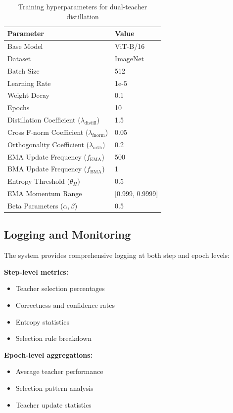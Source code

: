 \documentclass[11pt,a4paper]{article}
\begin{document}
\begin{table}[h]
\centering
\begin{tabular}{ll}
\toprule
\textbf{Parameter} & \textbf{Value} \\
\midrule
Base Model & ViT-B/16 \\
Dataset & ImageNet \\
Batch Size & 512 \\
Learning Rate & 1e-5 \\
Weight Decay & 0.1 \\
Epochs & 10 \\
Distillation Coefficient ($\lambda_{\text{distill}}$) & 1.5 \\
Cross F-norm Coefficient ($\lambda_{\text{fnorm}}$) & 0.05 \\
Orthogonality Coefficient ($\lambda_{\text{orth}}$) & 0.2 \\
EMA Update Frequency ($f_{\text{EMA}}$) & 500 \\
BMA Update Frequency ($f_{\text{BMA}}$) & 1 \\
Entropy Threshold ($\theta_H$) & 0.5 \\
EMA Momentum Range & [0.999, 0.9999] \\
Beta Parameters ($\alpha, \beta$) & 0.5 \\
\bottomrule
\end{tabular}
\caption{Training hyperparameters for dual-teacher distillation}
\end{table}

\subsection{Logging and Monitoring}

The system provides comprehensive logging at both step and epoch levels:

\textbf{Step-level metrics:}
\begin{itemize}
\item Teacher selection percentages
\item Correctness and confidence rates
\item Entropy statistics
\item Selection rule breakdown
\end{itemize}

\textbf{Epoch-level aggregations:}
\begin{itemize}
\item Average teacher performance
\item Selection pattern analysis
\item Teacher update statistics
\end{itemize}
\end{document}
